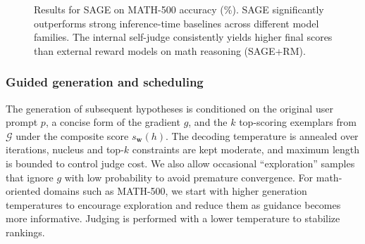 \documentclass[11pt]{article}
\theoremstyle{plain}
\theoremstyle{definition}
\theoremstyle{remark}
\newcommand{\method}{SAGE}
\begin{document}

\begin{figure}[ht]
\centering
{}
\caption{Results for \method{} on MATH-500 accuracy (\%). \method{} significantly outperforms strong inference-time baselines across different model families. The internal self-judge consistently yields higher final scores than external reward models on math reasoning (\method{}+RM).}
\label{fig:headline_math_single}
\end{figure}

\subsubsection{Guided generation and scheduling}
The generation of subsequent hypotheses is conditioned on the original user prompt \(p\), a concise form of the gradient \(g\), and the \(k\) top-scoring exemplars from \(\mathcal{G}\) under the composite score \(s_{\mathbf{w}}(h)\). The decoding temperature is annealed over iterations, nucleus and top-\(k\) constraints are kept moderate, and maximum length is bounded to control judge cost. We also allow occasional ``exploration'' samples that ignore \(g\) with low probability to avoid premature convergence. For math-oriented domains such as MATH-500, we start with higher generation temperatures to encourage exploration and reduce them as guidance becomes more informative. Judging is performed with a lower temperature to stabilize rankings.
\end{document}

